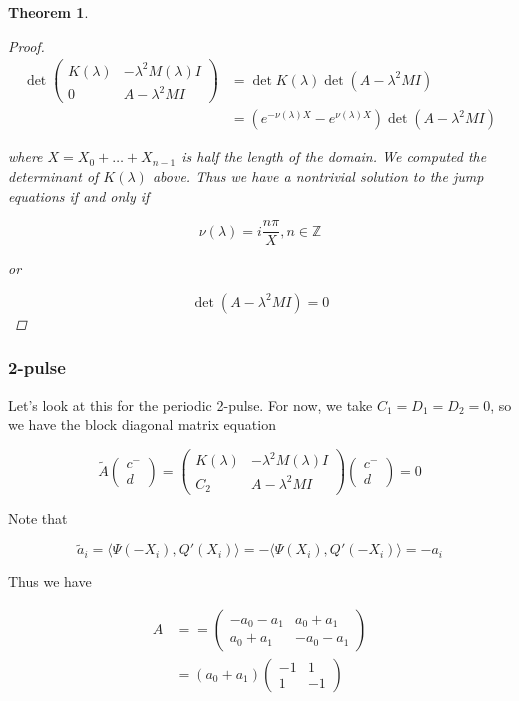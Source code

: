 \documentclass[12pt]{article}
\def\Z{{\mathbb Z}}
\newtheorem{theorem}{Theorem}
\begin{document}
\begin{theorem}
\begin{proof}
\begin{align*}
\det \begin{pmatrix}
K(\lambda) & -\lambda^2 M(\lambda) I \\
0 & A - \lambda^2 MI
\end{pmatrix} &= \det K(\lambda) \det(A - \lambda^2 MI)\\
&= ( e^{-\nu(\lambda) X} - e^{\nu(\lambda) X} ) \det(A - \lambda^2 MI)
\end{align*}

where $X = X_0 + \dots + X_{n-1}$ is half the length of the domain. We computed the determinant of $K(\lambda)$ above. Thus we have a nontrivial solution to the jump equations if and only if 

\[
\nu(\lambda) = i \frac{n \pi}{X}, n \in \Z
\]

or 

\[
\det(A - \lambda^2 MI) = 0
\]

\end{proof}
\end{theorem}


\subsubsection{2-pulse}

Let's look at this for the periodic 2-pulse. For now, we take $C_1 = D_1 = D_2 = 0$, so we have the block diagonal matrix equation

\begin{equation}
\tilde{A}\begin{pmatrix}c^- \\ d \end{pmatrix} = \begin{pmatrix}
K(\lambda) & -\lambda^2 M(\lambda) I  \\
C_2 & A - \lambda^2 MI
\end{pmatrix}
\begin{pmatrix}c^- \\ d \end{pmatrix} = 0
\end{equation}

Note that

\[
\tilde{a}_i = \langle \Psi(-X_i), Q'(X_i) \rangle = -\langle \Psi(X_i), Q'(-X_i) \rangle = -a_i
\]

Thus we have

\begin{align*}
A &== \begin{pmatrix}
-a_0 - a_1 & a_0 + a_1 \\
a_0 + a_1 & -a_0 - a_1
\end{pmatrix} \\
&= (a_0 + a_1)
\begin{pmatrix}
-1 & 1 \\
1 & -1
\end{pmatrix}
\end{align*}
\end{document}
